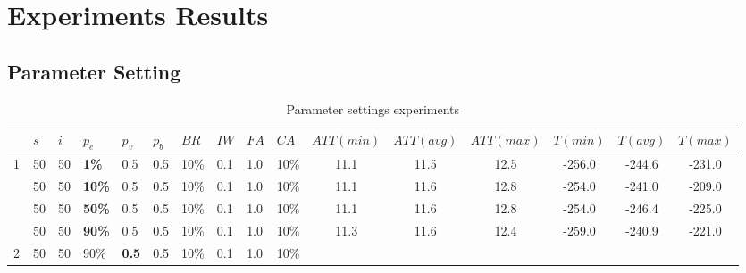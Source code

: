 \chapter{Experiments Results}
\label{appendixC}

\section{Parameter Setting}

\begin{sidewaystable}
    \centering
	\begin{tabular}{|l|l|l|l|l|l|l|l|l|l||c|c|c|c|c|c|}
 	\hline
 	~ & $s$ & $i$ & $p_{e}$ & $p_{v}$ & $p_{b}$ & $BR$ &$IW$ & $FA$ & $CA$ &  $ATT(min)$ & $ATT(avg)$ & $ATT(max)$ & $T(min)$ & $T(avg)$ & $T(max)$\\
 	\hline
    1 & 50 & 50 & \textbf{1\%} & 0.5 & 0.5 & 10\% & 0.1 & 1.0 & 10\% & 11.1 & 11.5 & 12.5 & -256.0 &-244.6 & -231.0  \\
    ~ & 50 & 50 & \textbf{10\%} & 0.5 & 0.5 & 10\% & 0.1 & 1.0 & 10\% & 11.1 & 11.6 & 12.8 & -254.0 & -241.0 & -209.0 \\
    ~ & 50 & 50 & \textbf{50\%} & 0.5 & 0.5 & 10\% & 0.1 & 1.0 & 10\% & 11.1 & 11.6 & 12.8 & -254.0 & -246.4 & -225.0\\
    ~ & 50 & 50 & \textbf{90\%} & 0.5 & 0.5 & 10\% & 0.1 & 1.0 & 10\% &  11.3 & 11.6 & 12.4 & -259.0 & -240.9 & -221.0  \\
    \hline
    2 & 50 & 50 & 90\% & \textbf{0.5} & 0.5 & 10\% & 0.1 & 1.0 & 10\% &  ~ & ~ & ~ & ~ & ~ & ~  \\
	\hline
    \end{tabular}
    \caption {Parameter settings experiments}
    \label{table:parameterSettings}
\end{sidewaystable}


